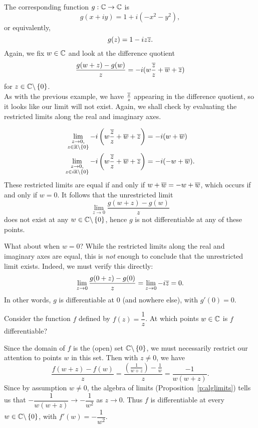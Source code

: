 \begin{solution}
The corresponding function $g: \mathbb{C} \to \mathbb{C}$ is
\[
g(x+iy) = 1+i(-x^2-y^2),
\]
or equivalently,
\[
g(z) = 1-i z \overline{z}.
\]
Again, we fix $w \in \mathbb{C}$ and look at the difference quotient
\[
\frac{g(w+z)-g(w)}{z} = -i(w \frac{\overline{z}}{z}+\overline{w}+\overline{z})
\]
for $z \in \mathbb{C} \backslash \left\{0\right\}$.\\

As with the previous example, we have $\frac{\overline{z}}{z}$ appearing in the difference quotient, so it looks like our limit will not exist.  Again, we shall check by evaluating the restricted limits along the real and imaginary axes.

\begin{align*}
\lim_{\substack{z \to 0, \\ z \in \mathbb{R} \backslash \left\{0\right\}}} -i \left( w \frac{\overline{z}}{z} + \overline{w} + \overline{z} \right) & = -i(w + \overline{w} ) \\
\lim_{\substack{z \to 0, \\ z \in i\mathbb{R} \backslash \left\{0\right\}}} -i \left( w \frac{\overline{z}}{z} + \overline{w} + \overline{z} \right) & = -i (-w+\overline{w} ).
\end{align*}
These restricted limits are equal if and only if $w+\overline{w} = -w + \overline{w}$, which occurs if and only if $w=0$.  It follows that the unrestricted limit
\[
\lim_{z \to 0} \frac{g(w+z)-g(w)}{z}
\]
does not exist at any $w \in \mathbb{C} \backslash \left\{0\right\}$, hence $g$ is not differentiable at any of these points.

What about when $w=0$?  While the restricted limits along the real and imaginary axes are equal, this is \emph{not} enough to conclude that the unrestricted limit exists.  Indeed, we must verify this directly:
\[
\lim_{z \to 0} \frac{g(0+z)-g(0)}{z} = \lim_{z \to 0} -i \overline{z} = 0.
\]
  In other words, $g$ is differentiable at $0$ (and nowhere else), with $g'(0)=0$.
\end{solution}




\begin{example}
\label{e:diff3}
Consider the function $f$ defined by $f(z)=\dfrac{1}{z}$.  At which points $w \in \mathbb{C}$ is $f$ differentiable?
\end{example}

\begin{solution}
Since the domain of $f$ is the (open) set $\mathbb{C} \backslash \left\{0\right\}$, we must necessarily restrict our attention to points $w$ in this set.  Then with $z \neq 0$, we have
\[
\frac{f(w+z)-f(w)}{z} = \frac{\left( \frac{1}{w+z} \right) - \frac{1}{w}}{z} = \frac{-1}{w(w+z)}.
\]
Since by assumption $w \neq 0$, the algebra of limits (Proposition~\ref{p:alglimits}) tells us that $-\dfrac{1}{w(w+z)} \to - \dfrac{1}{w^2}$ as $z \to 0$.  Thus $f$ is differentiable at every $w \in \mathbb{C} \backslash \left\{0\right\}$, with $f'(w) = -\dfrac{1}{w^2}$.
\end{solution}

